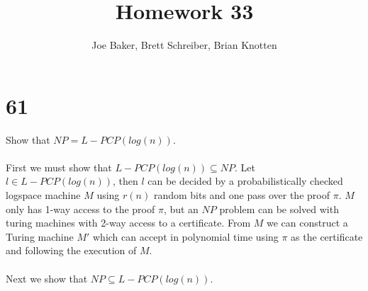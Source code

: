 \documentclass[letterpaper,notitlepage,twoside]{article}
\begin{document}
\title{Homework 33}
\author{Joe Baker, Brett Schreiber, Brian Knotten}
\maketitle

\section*{61}
Show that $NP = L-PCP(log(n))$.
\\\\
First we must show that $L-PCP(log(n)) \subseteq NP$. Let $l \in L-PCP(log(n))$, then $l$ can be decided by a probabilistically checked logspace machine $M$ using $r(n)$ random bits and one pass over the proof $\pi$. $M$ only has 1-way access to the proof $\pi$, but an $NP$ problem can be solved with turing machines with 2-way access to a certificate. From $M$ we can construct a Turing machine $M'$ which can accept in polynomial time using $\pi$ as the certificate and following the execution of $M$.
\\\\
Next we show that $NP \subseteq L-PCP(log(n))$.
\end{document}
